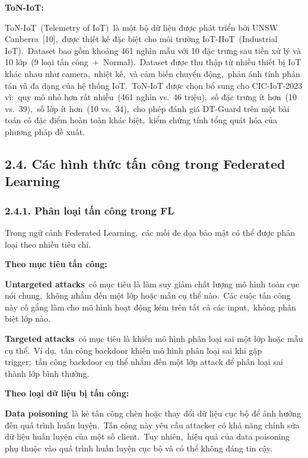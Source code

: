 \textbf{ToN-IoT:}

ToN-IoT~(Telemetry of IoT)~là một bộ dữ liệu được phát triển bởi UNSW Canberra~{[}10{]},~được thiết kế đặc biệt cho môi trường IoT-IIoT~(Industrial IoT).~Dataset bao gồm khoảng 461 nghìn mẫu với 10 đặc trưng sau tiền xử lý và 10 lớp~(9 loại tấn công~+~Normal).~Dataset được thu thập từ nhiều thiết bị IoT khác nhau như camera,~nhiệt kế,~và cảm biến chuyển động,~phản ánh tính phân tán và đa dạng của hệ thống IoT.~ToN-IoT được chọn bổ sung cho CIC-IoT-2023 vì:~quy mô nhỏ hơn rất nhiều~(461 nghìn vs.~46 triệu),~số đặc trưng ít hơn~(10 vs.~39),~số lớp ít hơn~(10 vs.~34),~cho phép đánh giá DT-Guard trên một bài toán có đặc điểm hoàn toàn khác biệt,~kiểm chứng tính tổng quát hóa của phương pháp đề xuất.

\subsection{2.4. Các hình thức tấn công trong Federated Learning}\label{cuxe1c-huxecnh-thux1ee9c-tux1ea5n-cuxf4ng-trong-federated-learning}

\subsubsection{2.4.1. Phân loại tấn công trong FL}\label{phuxe2n-loux1ea1i-tux1ea5n-cuxf4ng-trong-fl}

Trong ngữ cảnh Federated Learning,~các mối đe dọa bảo mật có thể được phân loại theo nhiều tiêu chí.

\textbf{Theo mục tiêu tấn công:}

\textbf{Untargeted attacks}~có mục tiêu là làm suy giảm chất lượng mô hình toàn cục nói chung,~không nhắm đến một lớp hoặc mẫu cụ thể nào.~Các cuộc tấn công này cố gắng làm cho mô hình hoạt động kém trên tất cả các input,~không phân biệt lớp nào.

\textbf{Targeted attacks}~có mục tiêu là khiến mô hình phân loại sai một lớp hoặc mẫu cụ thể.~Ví dụ,~tấn công backdoor khiến mô hình phân loại sai khi gặp trigger;~tấn công backdoor cụ thể nhắm đến một lớp attack để phân loại sai thành lớp bình thường.

\textbf{Theo loại dữ liệu bị tấn công:}

\textbf{Data poisoning}~là kẻ tấn công chèn hoặc thay đổi dữ liệu cục bộ để ảnh hưởng đến quá trình huấn luyện.~Tấn công này yêu cầu attacker có khả năng chỉnh sửa dữ liệu huấn luyện của một số client.~Tuy nhiên,~hiệu quả của data poisoning phụ thuộc vào quá trình huấn luyện cục bộ và có thể không đáng tin cậy.

